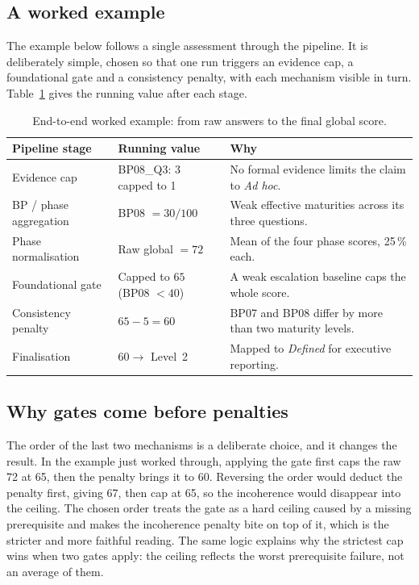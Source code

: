 \subsection{A worked example}
The example below follows a single assessment through the pipeline. It is
deliberately simple, chosen so that one run triggers an evidence cap, a foundational
gate and a consistency penalty, with each mechanism visible in turn.
Table~\ref{tab:se-worked-example} gives the running value after each stage.

\begin{table}[htbp]
  \centering
  \caption{End-to-end worked example: from raw answers to the final global score.}
  \label{tab:se-worked-example}
  \begin{tabular}{@{}p{2.8cm}p{3.0cm}p{5.4cm}@{}}
    \toprule
    Pipeline stage & Running value & Why \\
    \midrule
    Evidence cap           & BP08\_Q3: 3 capped to 1 & No formal evidence limits the claim to \emph{Ad hoc}. \\
    BP / phase aggregation & BP08 $= 30/100$         & Weak effective maturities across its three questions. \\
    Phase normalisation    & Raw global $= 72$       & Mean of the four phase scores, 25\,\% each. \\
    Foundational gate      & Capped to $65$ (BP08 $< 40$) & A weak escalation baseline caps the whole score. \\
    Consistency penalty    & $65 - 5 = 60$           & BP07 and BP08 differ by more than two maturity levels. \\
    Finalisation           & $60 \rightarrow$ Level~2 & Mapped to \emph{Defined} for executive reporting. \\
    \bottomrule
  \end{tabular}
\end{table}


\subsection{Why gates come before penalties}

The order of the last two mechanisms is a deliberate choice, and it changes the
result. In the example just worked through, applying the gate first caps the raw 72
at 65, then the penalty brings it to 60. Reversing the order would
deduct the penalty first, giving 67, then cap at 65, so the incoherence would
disappear into the ceiling. The chosen order treats the gate as a hard ceiling caused
by a missing prerequisite and makes the incoherence penalty bite on top of it, which
is the stricter and more faithful reading. The same logic explains why the strictest
cap wins when two gates apply: the ceiling reflects the worst prerequisite failure,
not an average of them.

